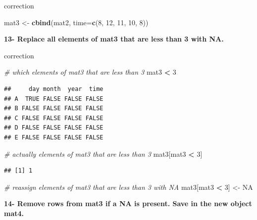 \documentclass[]{book}
\newenvironment{Shaded}{\begin{snugshade}}{\end{snugshade}}
\newcommand{\CommentTok}[1]{\textcolor[rgb]{0.56,0.35,0.01}{\textit{#1}}}
\newcommand{\DataTypeTok}[1]{\textcolor[rgb]{0.13,0.29,0.53}{#1}}
\newcommand{\DecValTok}[1]{\textcolor[rgb]{0.00,0.00,0.81}{#1}}
\newcommand{\KeywordTok}[1]{\textcolor[rgb]{0.13,0.29,0.53}{\textbf{#1}}}
\newcommand{\NormalTok}[1]{#1}
\newcommand{\OperatorTok}[1]{\textcolor[rgb]{0.81,0.36,0.00}{\textbf{#1}}}
\newcommand{\OtherTok}[1]{\textcolor[rgb]{0.56,0.35,0.01}{#1}}
\newcommand{\StringTok}[1]{\textcolor[rgb]{0.31,0.60,0.02}{#1}}
\begin{document}
correction

\begin{Shaded}
\begin{Highlighting}[]
\NormalTok{mat3 <-}\StringTok{ }\KeywordTok{cbind}\NormalTok{(mat2, }\DataTypeTok{time=}\KeywordTok{c}\NormalTok{(}\DecValTok{8}\NormalTok{, }\DecValTok{12}\NormalTok{, }\DecValTok{11}\NormalTok{, }\DecValTok{10}\NormalTok{, }\DecValTok{8}\NormalTok{))}
\end{Highlighting}
\end{Shaded}

\textbf{13- Replace all elements of mat3 that are less than 3 with NA.}

correction

\begin{Shaded}
\begin{Highlighting}[]
\CommentTok{# which elements of mat3 that are less than 3}
\NormalTok{mat3 }\OperatorTok{<}\StringTok{ }\DecValTok{3}
\end{Highlighting}
\end{Shaded}

\begin{verbatim}
##     day month  year  time
## A  TRUE FALSE FALSE FALSE
## B FALSE FALSE FALSE FALSE
## C FALSE FALSE FALSE FALSE
## D FALSE FALSE FALSE FALSE
## E FALSE FALSE FALSE FALSE
\end{verbatim}

\begin{Shaded}
\begin{Highlighting}[]
\CommentTok{# actually elements of mat3 that are less than 3}
\NormalTok{mat3[mat3 }\OperatorTok{<}\StringTok{ }\DecValTok{3}\NormalTok{]}
\end{Highlighting}
\end{Shaded}

\begin{verbatim}
## [1] 1
\end{verbatim}

\begin{Shaded}
\begin{Highlighting}[]
\CommentTok{# reassign elements of mat3 that are less than 3 with NA}
\NormalTok{mat3[mat3 }\OperatorTok{<}\StringTok{ }\DecValTok{3}\NormalTok{] <-}\StringTok{ }\OtherTok{NA}
\end{Highlighting}
\end{Shaded}

\textbf{14- Remove rows from mat3 if a NA is present. Save in the new object mat4.}
\end{document}
